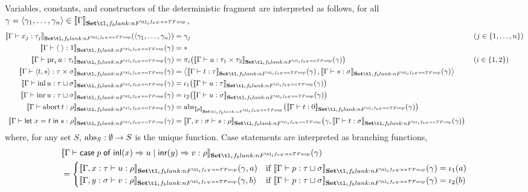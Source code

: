 \documentclass[11pt,a4paper]{article}
\theoremstyle{definition}
\theoremstyle{remark}
\providecommand{\casest}[5]{\mathsf{case}\;#1\;\mathsf{of}\;\mathsf{inl}(#2)\Rightarrow #3\;|\;\mathsf{inr}(#4)\Rightarrow #5}
\providecommand{\letst}[3]{\mathsf{let}\;#1=#2\;\mathsf{in}\;#3}
\providecommand{\setint}[1]{\llbracket #1\rrbracket_{\Set}}
\begin{document}
Variables, constants, and constructors of the deterministic fragment are interpreted as follows, for all \( \gamma = \tuple{\gamma_{1}, \dots, \gamma_{n}} \in \setint{\Gamma} \),
\begin{equation*}
  \begin{aligned}
    \fn[n]{ \setint{\Gamma \vdash x_{j} : \tau_{j}} }{\tuple{\gamma_{1}, \dots, \gamma_{n}}}
    &= \gamma_{j}
      && \left( j \in \left\{ 1, \dots, n \right\} \right)
    \\
    \fn[n]{ \setint{\Gamma \vdash \tuple{\;} : 1} }{\gamma}
    &= \ast
    \\
    \fn[n]{ \setint{\Gamma \vdash \opn[b]{pr}_{i} u : \tau_{i}} }{\gamma}
    &= \fn[n]{ \pi_{i} }{ \fn[n]{ \setint{\Gamma \vdash u : \tau_{1} \times \tau_{2}} }{ \gamma } }
      && \left( i \in \left\{ 1, 2 \right\} \right)
    \\
    \fn[n]{ \setint{\Gamma \vdash \tuple{ t, s } : \tau \times \sigma} }{\gamma}
    &=
      \tuple{
      \fn[n]{ \setint{ \Gamma \vdash t : \tau } }{ \gamma },
      \fn[n]{ \setint{ \Gamma \vdash s : \sigma } }{ \gamma }
      }
    \\
    \fn[n]{ \setint{\Gamma \vdash \opn[b]{inl} u : \tau \sqcup \sigma} }{\gamma}
    &= \fn[n]{ \iota_{1} }{ \fn[n]{ \setint{\Gamma \vdash u: \tau} }{ \gamma } }
    \\
    \fn[n]{ \setint{\Gamma \vdash \opn[b]{inr} u : \tau \sqcup \sigma} }{\gamma}
    &= \fn[n]{ \iota_{2} }{ \fn[n]{ \setint{\Gamma \vdash u: \sigma} }{ \gamma } }
    \\
    \fn[n]{ \setint{\Gamma \vdash \opn[b]{abort} t : \rho} }{\gamma}
    &= \fn[n]{ \opn{abs}_{\setint{\rho}} }{
      \fn[n]{ \setint{\Gamma \vdash t : 0} }{\gamma}
    }
    \\
    \fn[n]{ \setint{\Gamma \vdash \letst{x}{t}{s} : \rho} }{ \gamma }
    &=
      \fn[n]{ \setint{\Gamma, x : \sigma \vdash s : \rho} }{
      \gamma,
      \fn[n]{ \setint{\Gamma \vdash t : \sigma} }{ \gamma }
      }
  \end{aligned}
\end{equation*}
where, for any set \( S \), \( \opn{abs}_{S}: \emptyset \to S \) is the unique function. Case statements are interpreted as branching functions,
\begin{equation*}
  \begin{aligned}
    &\fn[n]{ \setint{\Gamma \vdash \casest{p}{x}{u}{y}{v} : \rho} }{ \gamma }
      \qquad
    \\
    &=
      \begin{cases}
        \fn[n]{ \setint{\Gamma, x : \tau \vdash u : \rho} }{ \gamma, a }
        &\text{if }
          \fn[n]{ \setint{\Gamma \vdash p : \tau \sqcup \sigma} }{ \gamma }
          = \fn[n]{ \iota_{1} }{ a }
        \\
        \fn[n]{ \setint{\Gamma, y : \sigma \vdash v : \rho} }{ \gamma, b }
        &\text{if }
          \fn[n]{ \setint{\Gamma \vdash p : \tau \sqcup \sigma} }{ \gamma }
          = \fn[n]{ \iota_{2} }{ b }
      \end{cases}
  \end{aligned}
\end{equation*}
\end{document}
